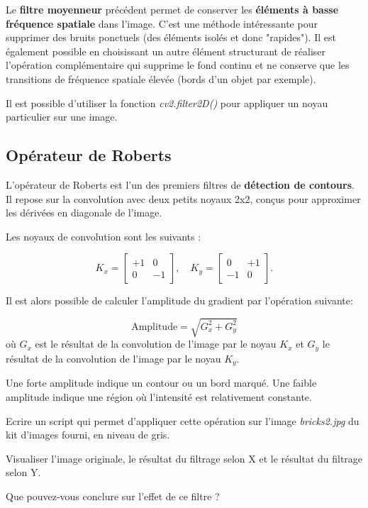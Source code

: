 \documentclass[a4paper,11pt,titlepage]{article} %
\begin{document}
Le \textbf{filtre moyenneur} précédent permet de conserver les \textbf{éléments à basse fréquence spatiale} dans l'image. C'est une méthode intéressante pour supprimer des bruits ponctuels (des éléments isolés et donc "rapides"). Il est également possible en choisissant un autre élément structurant de réaliser l'opération complémentaire qui supprime le fond continu et ne conserve que les transitions de fréquence spatiale élevée (bords d'un objet par exemple).

\medskip

Il est possible d'utiliser la fonction \textsl{cv2.filter2D()} pour appliquer un noyau particulier sur une image.

\subsection{Opérateur de Roberts}

L'opérateur de Roberts est l'un des premiers filtres de \textbf{détection de contours}. Il repose sur la convolution avec deux petits noyaux 2x2, conçus pour approximer les dérivées en diagonale de l'image.

Les noyaux de convolution sont les suivants :

$$K_x = \begin{bmatrix}
+1 & 0 \\
0 & -1
\end{bmatrix},
\quad
K_y =
\begin{bmatrix}
0 & +1 \\
-1 & 0
\end{bmatrix}.
$$

Il est alors possible de calculer l'amplitude du gradient par l'opération suivante: 

$$\text{Amplitude} = \sqrt{G_x^2 + G_y^2}$$ où $G_x$ est le résultat de la convolution de l'image par le noyau $K_x$ et $G_y$ le résultat de la convolution de l'image par le noyau $K_y$.

Une forte amplitude indique un contour ou un bord marqué. Une faible amplitude indique une région où l'intensité est relativement constante.

\medskip

\Manip Ecrire un script qui permet d'appliquer cette opération sur l'image \textsl{bricks2.jpg} du kit d'images fourni, en niveau de gris.

\Manip Visualiser l'image originale, le résultat du filtrage selon X et le résultat du filtrage selon Y.

\Quest Que pouvez-vous conclure sur l'effet de ce filtre ?
\end{document}
